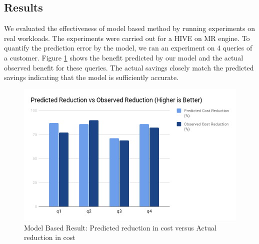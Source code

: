 \subsection{Results}
We evaluated the effectiveness of model based method by running experiments on real workloads. The experiments were carried out for a HIVE on MR engine. To quantify the prediction error by the model, we ran an experiment on 4 queries of a customer. Figure \ref{fig:modelbasedresult} shows the benefit predicted by our model and the actual observed benefit for these queries. The actual savings closely match the predicted savings indicating that the model is sufficiently accurate.

\begin{figure}[h]
	\includegraphics[width=\linewidth]{chart.png}
	\caption{Model Based Result: Predicted reduction in cost versus Actual reduction in cost}
	\label{fig:modelbasedresult}
\end{figure}
